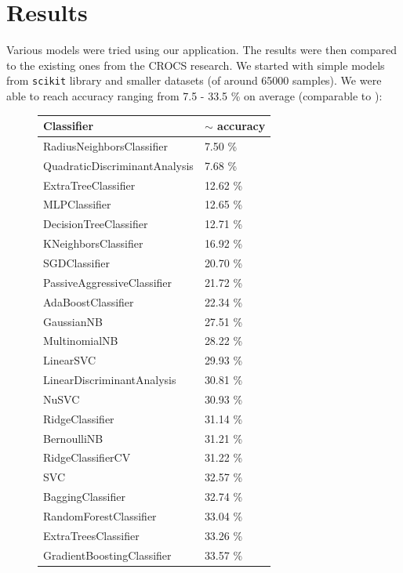 \chapter{Results}

Various models were tried using our application. The results were then compared to the existing ones from the CROCS research. We started with simple models from \texttt{scikit} library and smaller datasets (of around 65000 samples). We were able to reach accuracy ranging from 7.5 - 33.5 \% on average (comparable to \cite{thesis_sekan}):

\begin{figure}[H]

\centering

\begin{tabular}{|l|l|}
\hline 
Classifier & $\sim$ accuracy \\
\hline 
RadiusNeighborsClassifier & 7.50 \% \\
QuadraticDiscriminantAnalysis & 7.68 \% \\
ExtraTreeClassifier & 12.62 \% \\
MLPClassifier & 12.65 \% \\
DecisionTreeClassifier & 12.71 \% \\
KNeighborsClassifier & 16.92 \% \\
SGDClassifier & 20.70 \% \\
PassiveAggressiveClassifier & 21.72 \% \\
AdaBoostClassifier & 22.34 \% \\
GaussianNB & 27.51 \% \\
MultinomialNB & 28.22 \% \\
LinearSVC & 29.93 \% \\
LinearDiscriminantAnalysis & 30.81 \% \\
NuSVC & 30.93 \% \\
RidgeClassifier & 31.14 \% \\
BernoulliNB & 31.21 \% \\
RidgeClassifierCV & 31.22 \% \\
SVC & 32.57 \% \\
BaggingClassifier & 32.74 \% \\
RandomForestClassifier & 33.04 \% \\
ExtraTreesClassifier & 33.26 \% \\
GradientBoostingClassifier & 33.57 \% \\ 
\hline
\end{tabular}

\end{figure}

